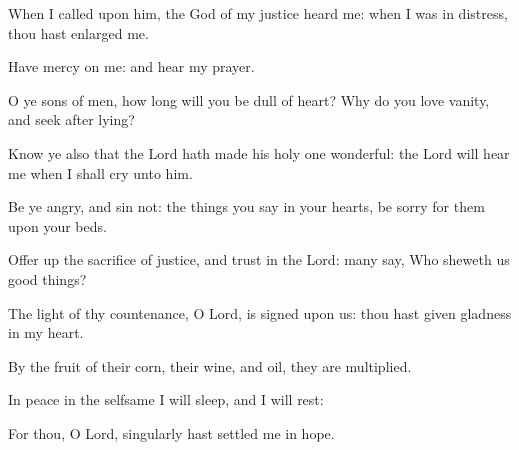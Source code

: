 \item When I called upon him, the God of my justice heard me: when I was in distress, thou hast enlarged me.
\item Have mercy on me: and hear my prayer.
\item O ye sons of men, how long will you be dull of heart? Why do you love vanity, and seek after lying?
\item Know ye also that the Lord hath made his holy one wonderful: the Lord will hear me when I shall cry unto him.
\item Be ye angry, and sin not: the things you say in your hearts, be sorry for them upon your beds.
\item Offer up the sacrifice of justice, and trust in the Lord: many say, Who sheweth us good things?
\item The light of thy countenance, O Lord, is signed upon us: thou hast given gladness in my heart.
\item By the fruit of their corn, their wine, and oil, they are multiplied.
\item In peace in the selfsame I will sleep, and I will rest:
\item For thou, O Lord, singularly hast settled me in hope.
